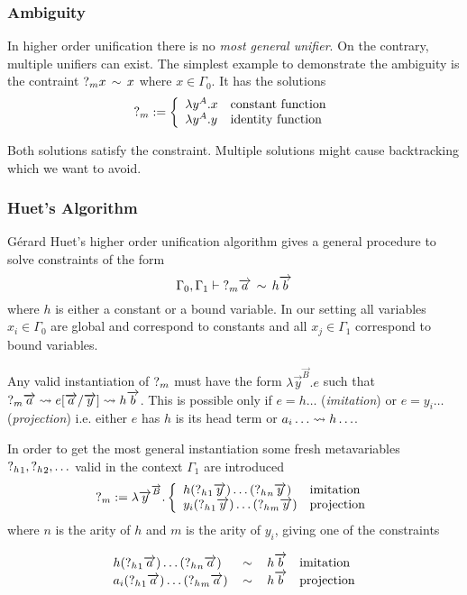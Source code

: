 \subsubsection{Ambiguity}
In higher order unification there is no \emph{most general unifier}. On the
contrary, multiple unifiers can exist. The simplest example to demonstrate the
ambiguity is the contraint ${?_{m}} x \,\sim\, x$ where $x \in \Gamma_0$. It has
the solutions
$$
    {?_{m}} := \left\{ \begin{array}{lllll} 
        \lambda y^A. x & \text{constant function}
        \\
        \lambda y^A. y & \text{identity function}
     \end{array} \right.
$$

Both solutions satisfy the constraint. Multiple solutions might cause
backtracking which we want to avoid.




\subsubsection{Huet's Algorithm}
Gérard Huet's higher order unification algorithm gives a general procedure to
solve constraints of the form
$$
    \Gamma_0, \Gamma_1
    \vdash
    {?_{m}} {\overrightarrow {a}} \,\sim\, h {\overrightarrow {b}}
$$
where $h$ is either a constant or a bound variable. In our setting all variables
$x_i \in \Gamma_0$ are global and correspond to constants and all $x_j
\in \Gamma_1$ correspond to bound variables.

Any valid instantiation of ${?_{m}}$ must have the form
    $\lambda \vec y^{\vec B}. e$
such that
    ${?_{m}} {\overrightarrow {a}} \leadsto e[{\overrightarrow {a}}/{\overrightarrow {y}}] \leadsto h {\overrightarrow {b}}$.
%
This is possible only if
    $e = h \ldots$ (\emph{imitation}) or
    $e = y_i \ldots$ (\emph{projection})
i.e. either $e$ has $h$ is its head term or
    $a_i \ldots \leadsto h \ldots$.


In order to get the most general instantiation some fresh metavariables ${?_{h}}_1, {?_{h}}_2, \ldots$ valid in the context $\Gamma_1$ are introduced
$$
    {?_{m}}
    := \lambda {\overrightarrow {y}}^{{\overrightarrow {B}}}.
    \left\{ \begin{array}{lllll} 
        h ({?_{h}}_1 {\overrightarrow {y}}) \ldots ({?_{h}}_n {\overrightarrow {y}})
        & \text{imitation}
        \\
        y_i ({?_{h}}_1 {\overrightarrow {y}}) \ldots ({?_{h}}_m {\overrightarrow {y}})
        & \text{projection}
     \end{array} \right.
$$
%
where $n$ is the arity of $h$ and $m$ is the arity of $y_i$,
giving one of the constraints

$$
\begin{array}{lllll} 
    h ({?_{h}}_1 {\overrightarrow {a}}) \ldots ({?_{h}}_n {\overrightarrow {a}})
    &\,\sim\,&
    h {\overrightarrow {b}}
    & \text{imitation}
    \\
    a_i ({?_{h}}_1 {\overrightarrow {a}}) \ldots ({?_{h}}_m {\overrightarrow {a}})
    &\,\sim\,&
    h {\overrightarrow {b}}
    & \text{projection}
 \end{array}
$$

